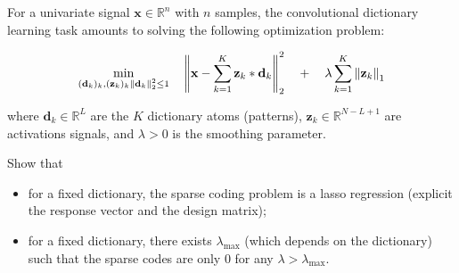 \documentclass[11pt]{article}
\begin{document}
\begin{exercise}
For a univariate signal $\mathbf{x}\in\mathbb{R}^n$ with $n$ samples, the convolutional dictionary learning task amounts to solving the following optimization problem:

\begin{equation}
\min_{(\mathbf{d}_k)_k, (\mathbf{z}_k)_k \\ \left\lVert\mathbf{d}_k\right\rVert_2^2\leq 1} \quad\left\lVert\mathbf{x} - \sum_{k=1}^K \mathbf{z}_k * \mathbf{d}_k \right\rVert^2_2 \quad + \quad\lambda \sum_{k=1}^K \left\lVert\mathbf{z}_k\right\rVert_1
\end{equation}

where $\mathbf{d}_k\in\mathbb{R}^L$ are the $K$ dictionary atoms (patterns), $\mathbf{z}_k\in\mathbb{R}^{N-L+1}$ are activations signals, and $\lambda>0$ is the smoothing parameter.

Show that
\begin{itemize}
    \item for a fixed dictionary, the sparse coding problem is a lasso regression (explicit the response vector and the design matrix);
    \item for a fixed dictionary, there exists $\lambda_{\max}$ (which depends on the dictionary) such that the sparse codes are only 0 for any $\lambda > \lambda_{\max}$.
\end{itemize}
\end{exercise}
\end{document}
